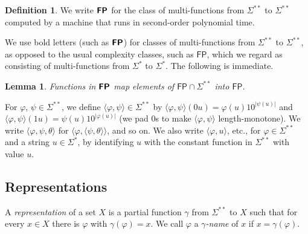 \documentclass[conference]{IEEEtran}
\newcommand{\classonefont}[1]{\mathsf{#1}}
\newcommand{\classFP}{\classonefont{FP}}
\newcommand{\classtwofont}[1]{\text{\bfseries \sffamily \upshape #1}}
\newcommand{\classFPtwo}{\classtwofont{FP}}
\newcommand{\LM}{\varSigma ^{**}}
\newtheorem{lemma}[theorem]{Lemma}
\theoremstyle{definition}
\newtheorem{definition}[theorem]{Definition}
\theoremstyle{remark}
\begin{document}
\begin{definition}
 We write $\classFPtwo$ for the class of
 multi-functions from $\LM$ to $\LM$ 
 computed by a machine that runs
 in second-order polynomial time.
\end{definition}

We use bold letters (such as $\classFPtwo$) 
for classes of multi-functions from $\LM$ to $\LM$, 
as opposed to the usual complexity classes, such as $\classFP$, 
which we regard as consisting of multi-functions from $\varSigma ^*$ to $\varSigma ^*$.
The following is immediate. 

\begin{lemma}
\label{lemma: classFPtwo maps classFP to classFP}
 Functions in $\classFPtwo$ map 
 elements of $\classFP \cap \LM$ into $\classFP$.
\end{lemma}

For $\varphi$, $\psi \in \LM$, 
we define $\langle \varphi, \psi \rangle \in \LM$ by 
$\langle \varphi, \psi \rangle(0u) = \varphi(u) 10^{|\psi(u)|}$ and 
$\langle \varphi, \psi \rangle(1u) = \psi(u) 10^{|\varphi(u)|}$
(we pad $0$s to make $\langle \varphi, \psi \rangle$ length-monotone).
We write $\langle \varphi, \psi, \theta \rangle$ 
for $\langle \varphi, \langle \psi, \theta \rangle \rangle$, and so on.
We also write $\langle \varphi, u \rangle$, etc., for 
$\varphi \in \LM$ and a string $u \in \varSigma ^*$, 
by identifying $u$ with the constant function in $\LM$ with value $u$. 

\subsection{Representations}
\label{subsection: representations}

A \emph{representation} of a set $X$ 
is a partial function $\gamma$ from $\LM$ to $X$
such that for every $x \in X$ there is $\varphi$ with $\gamma (\varphi) = x$.
We call $\varphi$ a {\em $\gamma$-name} of $x$
if $x = \gamma (\varphi)$.
\end{document}
